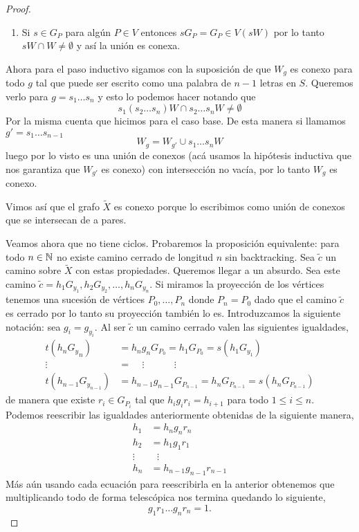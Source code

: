 \documentclass[tesis.tex]{subfiles}
\begin{document}
\begin{proof}
\begin{enumerate}
		\item Si $s \in G_P$ para algún $P \in V$ entonces $s G_P = G_P \in V(sW)$ por lo tanto $sW \cap W \neq \emptyset$ y así la unión es conexa.
	\end{enumerate} 

	Ahora para el paso inductivo sigamos con la suposición de que $W_{g}$ es conexo para todo $g$ tal que puede ser escrito como una palabra de $n-1$ letras en $S$. 
	Queremos verlo para $g = s_1\dots s_n$ y esto lo podemos hacer notando que 
	\[
	s_1(s_2 \dots s_n) W \cap s_2 \dots s_{n} W \neq \emptyset 
	\]
	Por la misma cuenta que hicimos para el caso base.
	De esta manera si llamamos $g' = s_{1} \dots s_{n-1}$
	\[
		W_{g} = W_{g'} \cup s_{1}\dots s_{n}W
	\]
	luego por lo visto es una unión de conexos (acá usamos la hipótesis inductiva que nos garantiza que $W_{g'}$ es conexo) con intersección no vacía, por lo tanto $W_{g}$ es conexo.
	
	Vimos así que el grafo $\tilde X$ es conexo porque lo escribimos como unión de conexos que se intersecan de a pares.
	
	Veamos ahora que no tiene ciclos.
	Probaremos la proposición equivalente: para todo $n \in \mathbb{N}$ no existe camino cerrado de longitud $n$ sin backtracking.
	Sea $\tilde c$ un camino sobre $\tilde X$ con estas propiedades. 
	Queremos llegar a un absurdo.
	Sea este camino $\tilde c = h_1G_{y_1}, h_2 G_{y_2}, \dots, h_n G_{y_n}$.
	Si miramos la proyección de los vértices tenemos una sucesión de vértices $P_0, \dots, P_n$ donde $P_n = P_0$ dado que el camino $\tilde c$ es cerrado por lo tanto su proyección también lo es.
	Introduzcamos la siguiente notación: sea $g_i = g_{y_i}$.
	Al ser $\tilde c$ un camino cerrado valen las siguientes igualdades,
	\begin{align*}
		t(h_n{G_y}_n) &= h_ng_nG_{P_0} = h_1G_{P_0} = s(h_1G_{ y_1}) \\ 
		\vdots \ \ \  &= \ \ \ \ \    \vdots\ \ \ \ \ \ \ \ \ \ \ \ \ \    \vdots \\
		t(h_{n-1}G_{y_{n-1}}) &= h_{n-1}g_{n-1}G_{P_{n-1}} = h_{n}G_{P_{n-1}} = s(h_nG_{P_{n-1}} )  
	\end{align*}
	de manera que existe $r_i \in G_{P_i}$ tal que $h_ig_ir_i = h_{i+1}$ para todo $1 \le i \le n$. 	
	Podemos reescribir las igualdades anteriormente obtenidas de la siguiente manera,
	\begin{align*}
		h_1 &= h_{n}g_{n}r_{n} \\
		h_2 &= h_1g_1r_1 \\
		\vdots & \ \ \ \vdots \\
		h_n &= h_{n-1}g_{n-1}r_{n-1} 
	\end{align*}
	Más aún usando cada ecuación para reescribirla en la anterior obtenemos que multiplicando todo de forma telescópica nos termina quedando lo siguiente,
	\begin{equation*}
		g_1r_1\dots g_nr_n = 1.
	\end{equation*} 
	

\end{proof}
\end{document}
